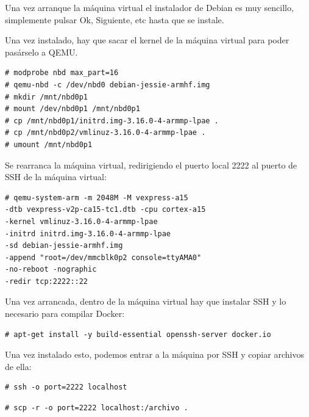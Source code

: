 \documentclass{tfg}
\begin{document}
Una vez arranque la máquina virtual el instalador de Debian es muy sencillo, simplemente pulsar Ok, Siguiente, etc hasta que se instale.

Una vez instalado, hay que sacar el kernel de la máquina virtual para poder pasárselo a QEMU.
\begin{lstlisting}[caption=Extraccion del kernel]
# modprobe nbd max_part=16
# qemu-nbd -c /dev/nbd0 debian-jessie-armhf.img
# mkdir /mnt/nbd0p1
# mount /dev/nbd0p1 /mnt/nbd0p1
# cp /mnt/nbd0p1/initrd.img-3.16.0-4-armmp-lpae .
# cp /mnt/nbd0p2/vmlinuz-3.16.0-4-armmp-lpae .
# umount /mnt/nbd0p1
\end{lstlisting}

Se rearranca la máquina virtual, redirigiendo el puerto local 2222 al puerto de SSH de la máquina virtual:
\begin{lstlisting}[caption=Rearrancado de la máquina virtual]
# qemu-system-arm -m 2048M -M vexpress-a15
-dtb vexpress-v2p-ca15-tc1.dtb -cpu cortex-a15
-kernel vmlinuz-3.16.0-4-armmp-lpae
-initrd initrd.img-3.16.0-4-armmp-lpae
-sd debian-jessie-armhf.img
-append "root=/dev/mmcblk0p2 console=ttyAMA0"
-no-reboot -nographic
-redir tcp:2222::22
\end{lstlisting}

Una vez arrancada, dentro de la máquina virtual hay que instalar SSH y lo necesario para compilar Docker:
\begin{lstlisting}[caption=Instalacion de paquetes]
# apt-get install -y build-essential openssh-server docker.io
\end{lstlisting}

Una vez instalado esto, podemos entrar a la máquina por SSH y copiar archivos de ella:
\begin{lstlisting}[caption=Entrar a la máquina]
# ssh -o port=2222 localhost
\end{lstlisting}
\begin{lstlisting}[caption=Extraer archivos de la máquina]
# scp -r -o port=2222 localhost:/archivo .
\end{lstlisting}

\end{document}
